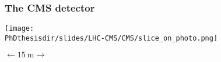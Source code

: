 \begin{frame}\addtocounter{framenumber}{-1}
\frametitle{The CMS detector}
\begin{center}
\vphantom{detects muons going through}

\vfill

\texttt{[image: \\PhDthesisdir/slides/LHC-CMS/CMS/slice\_on\_photo.png]}

\vfill

$\longleftarrow \SI{15}{\meter} \longrightarrow$
\end{center}
\end{frame}
